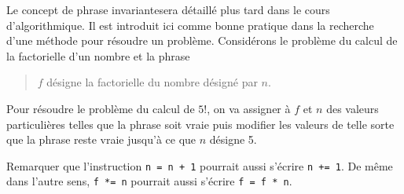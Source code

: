 Le concept de \og phrase invariante\fg sera détaillé plus tard dans le cours d'algorithmique. Il est introduit ici comme bonne pratique dans la recherche d'une méthode pour résoudre un problème.\newline
Considérons le problème du calcul de la factorielle d'un nombre et la phrase
\begin{quote}
  \og $f$ désigne la factorielle du nombre désigné par $n$.\fg
\end{quote}
Pour résoudre le problème du calcul de $5!$, on va assigner à $f$ et $n$ des valeurs particulières telles que la phrase soit vraie puis modifier les valeurs de telle sorte que la phrase reste vraie jusqu'à ce que $n$ désigne 5.

Remarquer que l'instruction \texttt{n = n + 1} pourrait aussi s'écrire \texttt{n += 1}. De même dans l'autre sens, \texttt{f *= n} pourrait aussi s'écrire \texttt{f = f * n}.
